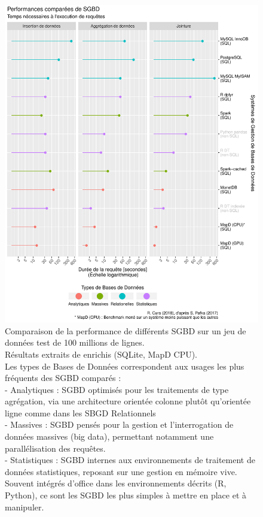 			\begin{figure}[H]
				\centering
				\includegraphics[width=\linewidth]{img/benchmark_results.pdf}
				\caption[Comparaison de la performance de différents SGBD sur un jeu de données test de 100 millions de lignes.]{Comparaison de la performance de différents SGBD sur un jeu de données test de 100 millions de lignes.\\
				Résultats extraits de \autocite{pafka_benchm-databases_2017} enrichis (SQLite, MapD CPU).\\
				Les \og types de Bases de Données\fg{} correspondent aux usages les plus fréquents des SGBD comparés :\\
				- Analytiques : SGBD optimisés pour les traitements de type agrégation, via une architecture orientée colonne plutôt qu'orientée ligne comme dans les SBGD Relationnels\\
				- Massives : SGBD pensés pour la gestion et l'interrogation de données massives (big data), permettant notamment une parallélisation des requêtes.\\
				- Statistiques : SGBD internes aux environnements de traitement de données statistiques, reposant sur une gestion en mémoire vive. Souvent intégrés d'office dans les environnements décrits (R, Python), ce sont les SGBD les plus simples à mettre en place et à manipuler.
			}
				\label{fig:db-benchmarks}
			\end{figure}


